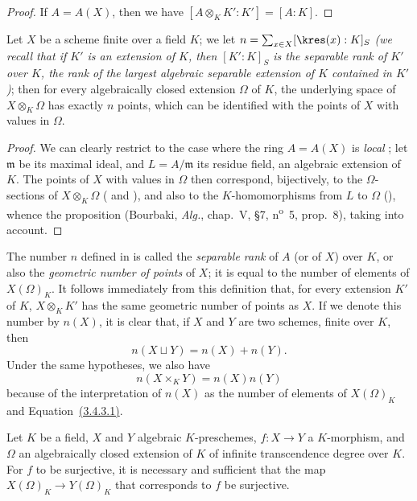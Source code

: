\begin{proof}
If $A=A(X)$, then we have $[A\otimes_K K':K']=[A:K]$.
\end{proof}

\begin{corollary}[6.4.7]
\label{I.6.4.7}
Let $X$ be a scheme finite over a field $K$;
we let $n=\sum_{x\in X}[\kres(x):K]_S$ \emph{(we recall that if $K'$ is an extension of $K$, then $[K':K]_S$ is the \emph{separable rank} of $K'$ over $K$, the rank of the largest algebraic separable extension of $K$ contained in $K'$)};
then
for every algebraically closed extension $\Omega$ of $K$, the underlying space of $X\otimes_K\Omega$ has exactly $n$ points, which can be identified with the points of $X$ with values in $\Omega$.
\end{corollary}

\begin{proof}
We can clearly restrict to the case where the ring $A=A(X)$ is \emph{local} ;
let $\mathfrak{m}$ be its maximal ideal, and $L=A/\mathfrak{m}$ its residue field, an algebraic extension of $K$.
The points of $X$ with values in $\Omega$ then correspond, bijectively, to the $\Omega$-sections of $X\otimes_K\Omega$ ( and ), and also to the $K$-homomorphisms from $L$ to $\Omega$ (), whence the proposition (Bourbaki, \emph{Alg.}, chap.~V, §7, n\textsuperscript{o}~5, prop.~8), taking  into account.
\end{proof}

\begin{env}[6.4.8]
\label{I.6.4.8}
The number $n$ defined in  is called the \emph{separable rank} of $A$ (or of $X$) over $K$, or also the \emph{geometric number of points} of $X$;
it is equal to the number of elements of $X(\Omega)_K$.
It follows immediately from this definition that, for every extension $K'$ of $K$, $X\otimes_K K'$ has the same geometric number of points as $X$.
If we denote this number by $n(X)$, it is clear that, if $X$ and $Y$ are two schemes, finite over $K$, then
\[
  n(X\sqcup Y)=n(X)+n(Y).
  \tag{6.4.8.1}
\]
Under the same hypotheses, we also have
\[
  n(X\times_K Y)=n(X)n(Y)
  \tag{6.4.8.2}
\]
because of the interpretation of $n(X)$ as the number of elements of $X(\Omega)_K$ and Equation~\hyperref[I.3.4.3]{(3.4.3.1)}.
\end{env}

\begin{proposition}[6.4.9]
\label{I.6.4.9}
Let $K$ be a field, $X$ and $Y$ algebraic $K$-preschemes, $f:X\to Y$ a $K$-morphism, and $\Omega$ an algebraically closed extension of $K$ of infinite transcendence degree over $K$.
For $f$ to be surjective, it is necessary and sufficient that the map $X(\Omega)_K\to Y(\Omega)_K$ that corresponds to $f$  be surjective.
\end{proposition}

